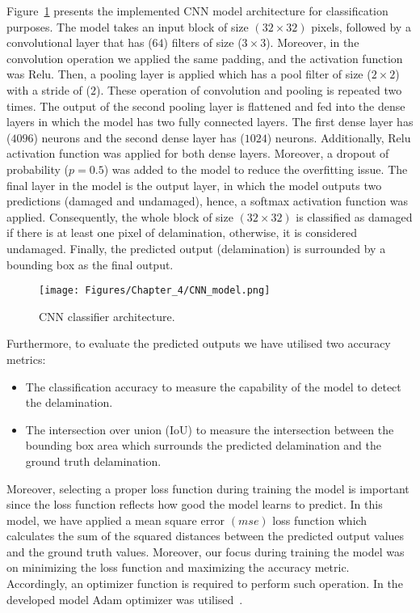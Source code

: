 Figure~\ref{CNN_model} presents the implemented CNN model architecture for classification purposes.
The model takes an input block of size \((32\times 32)\) pixels, followed by a convolutional layer that has (\(64\)) filters of size (\(3\times 3\)).
Moreover, in the convolution operation we applied the same padding, and the activation function was Relu.
Then, a pooling layer is applied which has a pool filter of size (\(2\times 2\)) with a stride of (\(2\)).
These operation of convolution and pooling is repeated two times.
The output of the second pooling layer is flattened and fed into the dense layers in which the model has two fully connected layers.
The first dense layer has (\(4096\)) neurons and the second dense layer has (\(1024\)) neurons.
Additionally, Relu activation function was applied for both dense layers.
Moreover, a dropout of probability (\(p = 0.5\)) was added to the model to reduce the overfitting issue.
The final layer in the model is the output layer, in which the model outputs two predictions (damaged and undamaged), hence, a softmax activation function was applied. 
Consequently, the whole block of size \((32\times 32)\) is classified as damaged if there is at least one pixel of delamination, otherwise, it is considered undamaged.
Finally, the predicted output (delamination) is surrounded by a bounding box as the final output.
\begin{figure}[h!]
	\centering
	\texttt{[image: Figures/Chapter\_4/CNN\_model.png]}
	\caption{CNN classifier architecture.}
	\label{CNN_model}
\end{figure}

Furthermore, to evaluate the predicted outputs we have utilised two accuracy metrics:
\begin{itemize}
	\item The classification accuracy to measure the capability of the model to detect the delamination.
	\item The intersection over union (IoU) to measure the intersection between the bounding box area which surrounds the predicted delamination and the ground truth delamination.
\end{itemize}

Moreover, selecting a proper loss function during training the model is important since the loss function reflects how good the model learns to predict.
In this model, we have applied a mean square error \((mse)\) loss function which calculates the sum of the squared distances between the predicted output values and the ground truth values.
Moreover, our focus during training the model was on minimizing the loss function and maximizing the accuracy metric.
Accordingly, an optimizer function is required to perform such operation.
In the developed model Adam optimizer was utilised~\cite{Kingma2015}. 